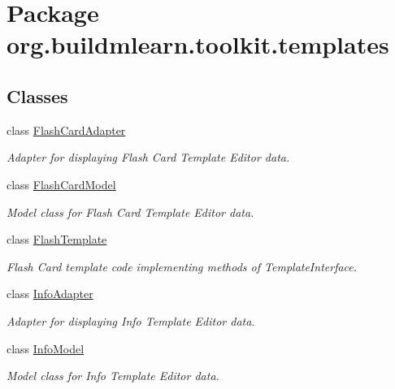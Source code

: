 \hypertarget{namespaceorg_1_1buildmlearn_1_1toolkit_1_1templates}{\section{Package org.\-buildmlearn.\-toolkit.\-templates}
\label{namespaceorg_1_1buildmlearn_1_1toolkit_1_1templates}
}
\subsection*{Classes}
\begin{DoxyCompactItemize}
\item 
class \hyperlink{classorg_1_1buildmlearn_1_1toolkit_1_1templates_1_1FlashCardAdapter}{Flash\-Card\-Adapter}
\begin{DoxyCompactList}\small\item\em Adapter for displaying Flash Card Template Editor data. \end{DoxyCompactList}\item 
class \hyperlink{classorg_1_1buildmlearn_1_1toolkit_1_1templates_1_1FlashCardModel}{Flash\-Card\-Model}
\begin{DoxyCompactList}\small\item\em Model class for Flash Card Template Editor data. \end{DoxyCompactList}\item 
class \hyperlink{classorg_1_1buildmlearn_1_1toolkit_1_1templates_1_1FlashTemplate}{Flash\-Template}
\begin{DoxyCompactList}\small\item\em Flash Card template code implementing methods of Template\-Interface. \end{DoxyCompactList}\item 
class \hyperlink{classorg_1_1buildmlearn_1_1toolkit_1_1templates_1_1InfoAdapter}{Info\-Adapter}
\begin{DoxyCompactList}\small\item\em Adapter for displaying Info Template Editor data. \end{DoxyCompactList}\item 
class \hyperlink{classorg_1_1buildmlearn_1_1toolkit_1_1templates_1_1InfoModel}{Info\-Model}
\begin{DoxyCompactList}\small\item\em Model class for Info Template Editor data. \end{DoxyCompactList}\item 

\end{DoxyCompactItemize}
